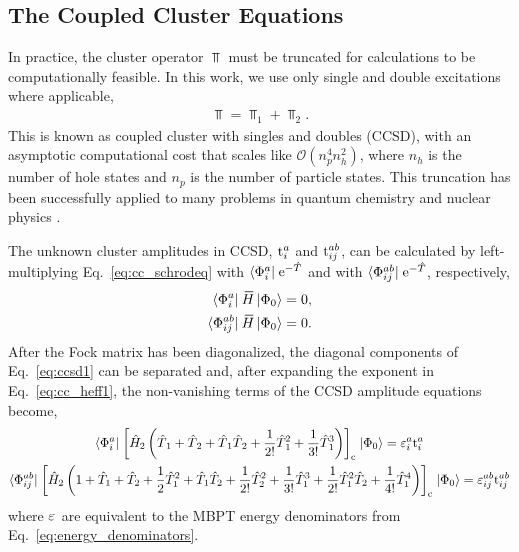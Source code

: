 \documentclass[thesis.tex]{subfiles}
\begin{document}
\subsection{The Coupled Cluster Equations} \label{section:intro_cc_equations}

In practice, the cluster operator $\Top$ must be truncated for calculations to be computationally feasible.  In this work, we use only single and double excitations where applicable,
\begin{align*}
  \Top = \Top_{1} + \Top_{2}.
\end{align*}
This is known as coupled cluster with singles and doubles (CCSD), with an asymptotic computational cost that scales like $\mathcal{O}\left( n_{p}^{4}n_{h}^{2} \right)$, where $n_{h}$ is the number of hole states and $n_{p}$ is the number of particle states.  This truncation has been successfully applied to many problems in quantum chemistry \cite{BARTLETT2007291} and nuclear physics \cite{KOWALSKI2004132501,HAGEN2014096302}.

The unknown cluster amplitudes in CCSD, $\text{t}^{a}_{i}$ and $\text{t}^{ab}_{ij}$, can be calculated by left-multiplying Eq.\ \eqref{eq:cc_schrodeq} with $\langle \Phi^{a}_{i} |\hspace{1pt} \operatorname{e}^{-\hat{T}\hspace{-0.25pt}}$ and with $\langle \Phi^{ab}_{ij} |\hspace{1pt} \operatorname{e}^{-\hat{T}\hspace{-0.25pt}}$, respectively,
\begin{align} \label{eq:ccsd1}
  \statebra{a}{i} \EHam \refket &= 0, \notag \\
  \statebra{ab}{ij} \EHam \refket &= 0.
\end{align}
After the Fock matrix has been diagonalized, the diagonal components of Eq.\ \eqref{eq:ccsd1} can be separated and, after expanding the exponent in Eq.\ \eqref{eq:cc_heff1}, the non-vanishing terms of the CCSD amplitude equations become,
\begin{gather} \label{eq:ccsd2}
  \langle \Phi^{a}_{i} |\hspace{1pt} \left[ \hat{H}\hspace{-1pt}_{2} \left(\hat{T}\hspace{-0.25pt}_{1} + \hat{T}\hspace{-0.25pt}_{2} + \hat{T}\hspace{-0.25pt}_{1}\hat{T}\hspace{-0.25pt}_{2} + \frac{1}{2!} \hat{T}\hspace{-0.25pt}_{1}^{2} + \frac{1}{3!} \hat{T}\hspace{-0.25pt}_{1}^{3}\right) \right]_{\mathrm{c}} \hspace{1pt}\lvert \Phi_{0} \rangle = \varepsilon^{a}_{i}\text{t}^{a}_{i} \\
  \langle \Phi^{ab}_{ij} |\hspace{1pt} \left[ \hat{H}\hspace{-1pt}_{2} \left(1 + \hat{T}_1 + \hat{T}_2 + \frac{1}{2} \hat{T}_1^{2} + \hat{T}_1\hat{T}_2 + \frac{1}{2!} \hat{T}_2^{2} + \frac{1}{3!} \hat{T}_1^{3} + \frac{1}{2!} \hat{T}_1^{2} \hat{T}_2 + \frac{1}{4!} \hat{T}_1^{4}\right) \right]_{\mathrm{c}} \hspace{1pt}\lvert \Phi_{0} \rangle = \varepsilon^{ab}_{ij}\text{t}^{ab}_{ij} \notag
\end{gather}
where $\varepsilon^{}_{}$ are equivalent to the MBPT energy denominators from Eq.\ \eqref{eq:energy_denominators}.
\end{document}

